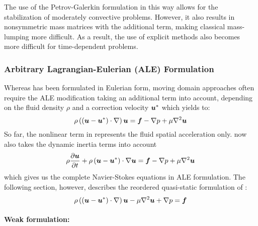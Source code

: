 The use of the Petrov-Galerkin formulation in this way allows for the
stabilization of moderately convective problems. However, it also results in
nonsymmetric mass matrices with the additional term, making classical
mass-lumping more difficult. As a result, the use of explicit methods also
becomes more difficult for time-dependent problems.


\subsubsection{Arbitrary Lagrangian-Eulerian (ALE) Formulation}
Whereas  has been formulated in Eulerian
form, moving domain approaches often require the ALE modification taking an
additional term into account, depending on the fluid density $\rho$ and a
correction velocity $\boldsymbol{u}^*$ which yields to:
\begin{equation}
  \rho\pbrac{\dotprod{\pbrac{\vectr{u}-\vectr{u}^*}}{\grad}}\vectr{u}=\vectr{f}-\gradient{}{p}+\mu\laplacian{}{\vectr{u}}
  \label{eqn:NavierStokesequationALE}
\end{equation}
So far, the nonlinear term in  represents
the fluid spatial acceleration only.  now
also takes the dynamic inertia terms into account
\begin{equation}
  \rho\delby{\vectr{u}}{t}+ \dotprod{\rho\pbrac{\vectr{u}-\vectr{u}^*}}{\grad}\vectr{u}=\vectr{f}-\gradient{}{p}+\mu\laplacian{}{\vectr{u}}
  \label{eqn:NavierStokesequation2}
\end{equation}
which gives us the complete Navier-Stokes equations in ALE formulation.  The
following section, however, describes the reordered quasi-static formulation
of :
\begin{equation}
  \rho\pbrac{\dotprod{\pbrac{\vectr{u}-\vectr{u}^*}}{\grad}}\vectr{u}-\mu\laplacian{}{\vectr{u}}+\gradient{}{p}=\vectr{f}
  \label{eqn:NavierStokesequationALE2}
\end{equation}

\paragraph{Weak formulation:}

